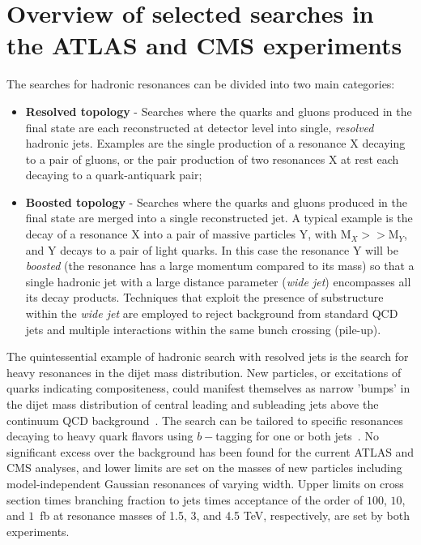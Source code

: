 \documentclass{PoS}
\begin{document}
\section{Overview of selected searches in the ATLAS and CMS experiments}

The searches for hadronic resonances can be divided into two main categories:
\begin{itemize}
 \item {\bf Resolved topology} - Searches where the quarks and gluons produced in the final state are each reconstructed at detector level into single,  \textit{resolved} hadronic jets. Examples are the single production of a resonance X decaying to a pair of gluons, or the pair production of two resonances X at rest each decaying to a quark-antiquark pair;
 \item {\bf Boosted topology} - Searches where the quarks and gluons produced in the final state are merged into a single reconstructed jet.  A typical example is the decay of a resonance X into a pair of massive particles Y, with $\mbox{M}_{X} >>\mbox{M}_{Y} $, and Y decays to a pair of light quarks. In this case the resonance Y will be \textit{boosted} 
(the resonance has a large momentum compared to its mass) so that a single hadronic jet with a large distance 
parameter (\textit{wide jet}) encompasses all its decay products. Techniques that exploit the presence of substructure within the \textit{wide jet} are employed to reject background from standard QCD jets and multiple interactions within the same bunch crossing (pile-up). 
\end{itemize}

The quintessential example of hadronic search with resolved jets is the 
search for heavy resonances in the dijet mass distribution. New particles, 
or excitations of quarks indicating 
compositeness,
could manifest 
themselves as narrow 'bumps' in the dijet mass distribution of central leading
and subleading jets above the continuum QCD background~\cite{CMS-PAS-EXO-12-059, ATLAS-CONF-2012-148}. 
The search can be tailored to specific resonances
decaying to heavy quark flavors using $b-$tagging for one or both jets~\cite{CMS-PAS-EXO-12-023}. 
No significant excess over the background has been found for the current ATLAS and CMS analyses,
and lower limits are set on the masses of new particles 
including model-independent Gaussian resonances of varying width.
Upper limits on cross section times branching fraction to jets times acceptance of the order of $100$, $10$, and 
$1$~fb at resonance masses of 1.5, 3, and 4.5 TeV, respectively, are set by both experiments.
\end{document}
